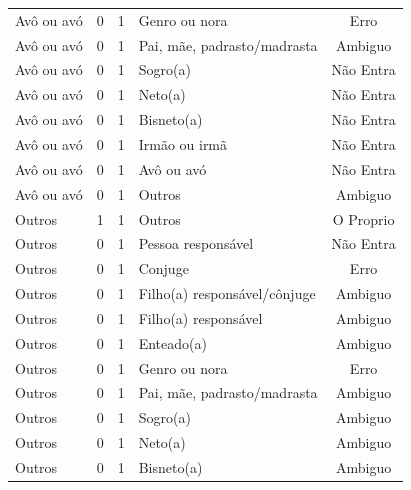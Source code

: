 \documentclass[
	12pt,				%
	openright,			%
	twoside,			%
	a4paper,			%
	english,			%
	french,				%
	spanish,			%
	brazil				%
	]{abntex2}
\begin{document}
\begin{anexosenv}
\begin{longtable}{@{}lcclc@{}}
Avô ou avó                   & 0         & 1        & Genro ou nora                & Erro            \\
Avô ou avó                   & 0         & 1        & Pai, mãe, padrasto/madrasta  & Ambiguo         \\
Avô ou avó                   & 0         & 1        & Sogro(a)                     & Não Entra       \\
Avô ou avó                   & 0         & 1        & Neto(a)                      & Não Entra       \\
Avô ou avó                   & 0         & 1        & Bisneto(a)                   & Não Entra       \\
Avô ou avó                   & 0         & 1        & Irmão ou irmã                & Não Entra       \\
Avô ou avó                   & 0         & 1        & Avô ou avó                   & Não Entra       \\
Avô ou avó                   & 0         & 1        & Outros                       & Ambiguo         \\
Outros                       & 1         & 1        & Outros                       & O Proprio       \\
Outros                       & 0         & 1        & Pessoa responsável           & Não Entra       \\
Outros                       & 0         & 1        & Conjuge                      & Erro            \\
Outros                       & 0         & 1        & Filho(a) responsável/cônjuge & Ambiguo         \\
Outros                       & 0         & 1        & Filho(a) responsável         & Ambiguo         \\
Outros                       & 0         & 1        & Enteado(a)                   & Ambiguo         \\
Outros                       & 0         & 1        & Genro ou nora                & Erro            \\
Outros                       & 0         & 1        & Pai, mãe, padrasto/madrasta  & Ambiguo         \\
Outros                       & 0         & 1        & Sogro(a)                     & Ambiguo         \\
Outros                       & 0         & 1        & Neto(a)                      & Ambiguo         \\
Outros                       & 0         & 1        & Bisneto(a)                   & Ambiguo         \\

\end{longtable}
\end{anexosenv}
\end{document}
